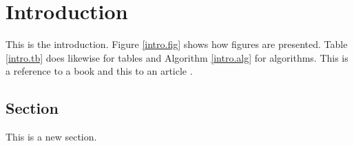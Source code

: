 
\graphicspath{{intro/figs/}}

\chapter{Introduction}
\label{intro}

This is the introduction. Figure \ref{intro.fig} shows how figures are presented. Table \ref{intro.tb} does likewise for tables and Algorithm \ref{intro.alg} for algorithms. This is a reference to a book \cite{and99} and this to an article \cite{don90}.

\section{Section}
\label{intro.section}

This is a new section.

